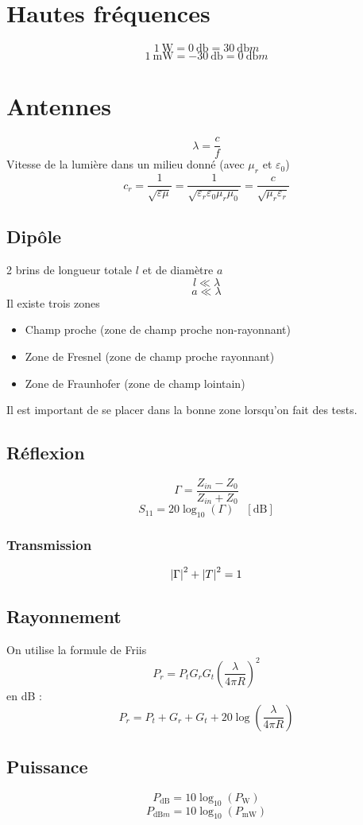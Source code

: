 \documentclass[resume]{subfiles}
\begin{document}
\section{Hautes fréquences}
$$\SI{1}{\watt}=\SI{0}{\decibel}=\SI{30}{\decibel m}$$
$$\SI{1}{\milli\watt}=\SI{-30}{\decibel}=\SI{0}{\decibel m}$$
\section{Antennes}
$$\boxed{\lambda=\frac{c}{f}}$$
Vitesse de la lumière dans un milieu donné (avec $\mu_r$ et $\varepsilon_0$)
$$c_r=\frac{1}{\sqrt{\varepsilon\mu}}=\frac{1}{\sqrt{\varepsilon_r\varepsilon_0\mu_r\mu_0}}=\frac{c}{\sqrt{\mu_r\varepsilon_r}}$$

\subsection{Dipôle}
2 brins de longueur totale $l$ et de diamètre $a$
$$l\ll \lambda$$
$$a\ll\lambda$$
Il existe trois zones
\begin{itemize}
\item Champ proche (zone de champ proche non-rayonnant)
\item Zone de Fresnel (zone de champ proche rayonnant)
\item Zone de Fraunhofer (zone de champ lointain)
\end{itemize}
Il est important de se placer dans la bonne zone lorsqu'on fait des tests.
\subsection{Réflexion}
$$\Gamma=\frac{Z_{in}-Z_0}{Z_{in}+Z_0}$$
$$S_{11}=20\log_{10}(\Gamma)\quad [\si{\deci\bel}]$$
\subsubsection{Transmission}
$$\abs{\Gamma}^2+\abs{T}^2=1$$
\subsection{Rayonnement}
On utilise la formule de Friis
$$P_r=P_tG_rG_t\left(\frac{\lambda}{4\pi R}\right)^2$$
en dB :
$$P_r=P_t+G_r+G_t+20\log\left(\frac{\lambda}{4\pi R}\right)$$
\subsection{Puissance}
$$\boxed{P_{\si{\deci\bel}}=10\log_{10}\left(P_{\si{\watt}}\right)}$$
$$\boxed{P_{\si{\deci\bel m}}=10\log_{10}\left(P_{\si{\milli\watt}}\right)}$$
\end{document}
